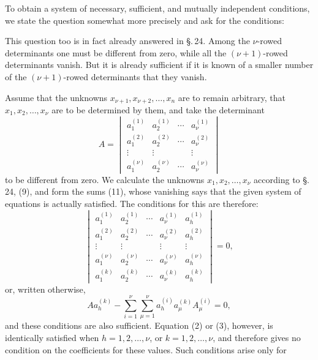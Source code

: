 
To obtain a system of necessary, sufficient, and mutually independent conditions, we state the question somewhat more precisely and ask for the conditions:


This question too is in fact already answered in \S.\,24. Among the \(\nu\)-rowed determinants one must be different from zero, while all the \((\nu+1)\)-rowed determinants vanish. But it is already sufficient if it is known of a smaller number of the \((\nu+1)\)-rowed determinants that they vanish.

Assume that the unknowns \(x_{\nu+1},x_{\nu+2},\ldots,x_n\) are to remain arbitrary, that \(x_1,x_2,\ldots,x_\nu\) are to be determined by them, and take the determinant
\begin{equation}
        A=\begin{vmatrix}
        a_1^{(1)}&a_2^{(1)}&\cdots&a_\nu^{(1)}\\
        a_1^{(2)}&a_2^{(2)}&\cdots&a_\nu^{(2)}\\
        \vdots&\vdots&&\vdots\\
        a_1^{(\nu)}&a_2^{(\nu)}&\cdots&a_\nu^{(\nu)}
        \end{vmatrix}
\tag{1}
\end{equation}
to be different from zero. We calculate the unknowns \(x_1,x_2,\ldots,x_\nu\) according to \S.\,24, (9), and form the sums (11), whose vanishing says that the given system of equations is actually satisfied. The conditions for this are therefore:
\begin{equation}
\begin{vmatrix}
        a_1^{(1)}&a_2^{(1)}&\cdots&a_\nu^{(1)}&a_h^{(1)}\\
        a_1^{(2)}&a_2^{(2)}&\cdots&a_\nu^{(2)}&a_h^{(2)}\\
        \vdots&\vdots&&\vdots&\vdots\\
        a_1^{(\nu)}&a_2^{(\nu)}&\cdots&a_\nu^{(\nu)}&a_h^{(\nu)}\\
        a_1^{(k)}&a_2^{(k)}&\cdots&a_\nu^{(k)}&a_h^{(k)}
\end{vmatrix}=0,
\tag{2}
\end{equation}
or, written otherwise,
\begin{equation}
        A a_h^{(k)}-\sum_{i=1}^{\nu}\sum_{\mu=1}^{\nu}
        a_h^{(i)}a_\mu^{(k)}A_\mu^{(i)}=0,
\tag{3}
\end{equation}
and these conditions are also sufficient. Equation (2) or (3), however, is identically satisfied when \(h=1,2,\ldots,\nu\), or \(k=1,2,\ldots,\nu\), and therefore gives no condition on the coefficients for these values. Such conditions arise only for
